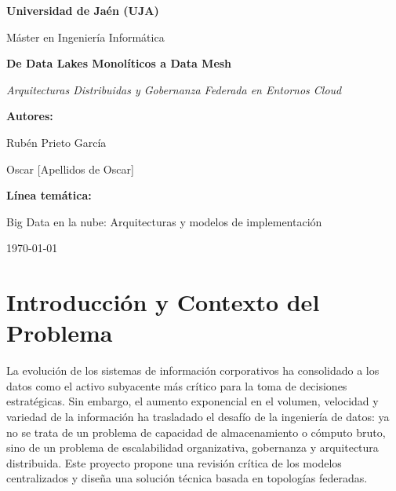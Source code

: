 \documentclass[12pt, a4paper]{article}
\begin{document}
\begin{titlepage}
    \centering
    \vspace*{2cm}
    
    {\Large \textbf{Universidad de Jaén (UJA)}\par}
    \vspace{0.5cm}
    {\large Máster en Ingeniería Informática\par}
    
    \vspace{3cm}
    
    {\Huge \textbf{De Data Lakes Monolíticos a Data Mesh}\par}
    \vspace{0.5cm}
    {\Large \textit{Arquitecturas Distribuidas y Gobernanza Federada en Entornos Cloud}\par}
    
    \vspace{3cm}
    
    {\large \textbf{Autores:}\par}
    {\normalsize Rubén Prieto García\par}
    {\normalsize Oscar [Apellidos de Oscar]\par}
    
    \vspace{2cm}
    
    {\large \textbf{Línea temática:}\par}
    {\normalsize Big Data en la nube: Arquitecturas y modelos de implementación\par}
    
    \vfill
    
    {\normalsize \today\par}
\end{titlepage}

\tableofcontents
\newpage

\section{Introducción y Contexto del Problema}

La evolución de los sistemas de información corporativos ha consolidado a los datos como el activo subyacente más crítico para la toma de decisiones estratégicas. Sin embargo, el aumento exponencial en el volumen, velocidad y variedad de la información ha trasladado el desafío de la ingeniería de datos: ya no se trata de un problema de capacidad de almacenamiento o cómputo bruto, sino de un problema de escalabilidad organizativa, gobernanza y arquitectura distribuida. Este proyecto propone una revisión crítica de los modelos centralizados y diseña una solución técnica basada en topologías federadas.
\end{document}
